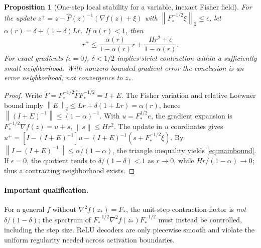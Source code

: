 \documentclass[10pt,a4paper]{article}
\newtheorem{proposition}{Proposition}
\newcommand{\norm}[1]{\left\lVert#1\right\rVert}
\begin{document}
\begin{proposition}[One-step local stability for a variable, inexact Fisher field]\label{prop:local}
For the update $z^+=z-\widehat F(z)^{-1}(\nabla f(z)+\xi)$ with $\norm{F_*^{-1/2}\xi}_2\le\epsilon$, let $\alpha(r)=\delta+(1+\delta)Lr$. If $\alpha(r)<1$, then
\begin{equation}\label{eq:mainbound}
 r^+\le\frac{\alpha(r)}{1-\alpha(r)}r+\frac{Hr^2+\epsilon}{1-\alpha(r)}.
\end{equation}
For exact gradients ($\epsilon=0$), $\delta<1/2$ implies strict contraction within a sufficiently small neighborhood. With nonzero bounded gradient error the conclusion is an error neighborhood, not convergence to $z_*$.
\end{proposition}
\begin{proof}
Write $\widetilde F=F_*^{-1/2}\widehat F F_*^{-1/2}=I+E$. The Fisher variation and relative Loewner bound imply $\norm{E}_2\le Lr+\delta(1+Lr)=\alpha(r)$, hence $\norm{(I+E)^{-1}}\le(1-\alpha)^{-1}$.
With $u=F_*^{1/2}e$, the gradient expansion is $F_*^{-1/2}\nabla f(z)=u+s$, $\norm{s}\le Hr^2$. The update in $u$ coordinates gives
$u^+=[I-(I+E)^{-1}]u-(I+E)^{-1}(s+F_*^{-1/2}\xi)$.
By $\norm{I-(I+E)^{-1}}\le\alpha/(1-\alpha)$, the triangle inequality yields \eqref{eq:mainbound}. If $\epsilon=0$, the quotient tends to $\delta/(1-\delta)<1$ as $r\to0$, while $Hr/(1-\alpha)\to0$; thus a contracting neighborhood exists.
\end{proof}
\paragraph{Important qualification.} For a general $f$ without $\nabla^2f(z_*)=F_*$, the unit-step contraction factor is \emph{not} $\delta/(1-\delta)$; the spectrum of $F_*^{-1/2}\nabla^2f(z_*)F_*^{-1/2}$ must instead be controlled, including the step size. ReLU decoders are only piecewise smooth and violate the uniform regularity needed across activation boundaries.
\end{document}
